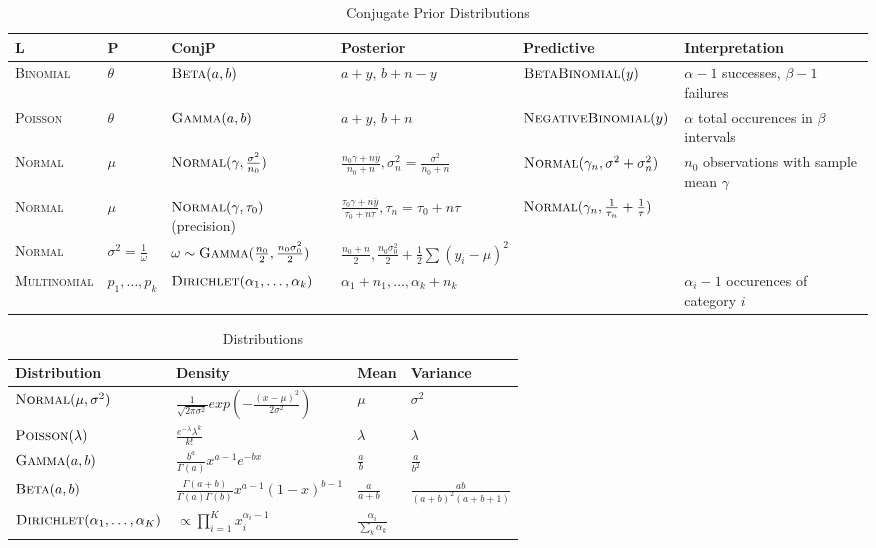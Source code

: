 \begin{table*}[p]
  \caption{Conjugate Prior Distributions}
\begin{tabular}{llllll}
\hline
L & P & ConjP & Posterior & Predictive & Interpretation \\
\hline
\textsc{Binomial} & $\theta$ & $\textsc{Beta}(a, b)$ & $a + y$, $b + n - y$ & $\textsc{BetaBinomial}(y)$ & $\alpha - 1$ successes, $\beta-1$ failures \\
\textsc{Poisson} & $\theta$ & $\textsc{Gamma}(a, b)$ & $a + y$, $b + n$ & $\textsc{NegativeBinomial}(y)$ & $\alpha$ total occurences in $\beta$ intervals \\
\textsc{Normal} & $\mu$ & $\textsc{Normal}(\gamma, \frac{\sigma^{2}}{n_{0}})$ & $\frac{n_{0} \gamma + n \overline y}{n_0 + n}, \sigma^{2}_{n} = \frac{\sigma^{2}}{n_{0} + n}$ & $\textsc{Normal}(\gamma_{n}, \sigma^{2} + \sigma^{2}_{n})$ & $n_{0}$ observations with sample mean $\gamma$ \\
\textsc{Normal} & $\mu$ & $\textsc{Normal}(\gamma, \tau_{0})$ (precision) & $\frac{\tau_{0} \gamma + n \overline y}{\tau_{0} + n \tau}, \tau_{n} = \tau_{0} + n \tau$ & $\textsc{Normal}(\gamma_{n}, \frac{1}{\tau_{n}} + \frac{1}{\tau})$ &  \\
\textsc{Normal} & $\sigma^{2} = \frac{1}{\omega}$ & $\omega \sim \textsc{Gamma}(\frac{n_{0}}{2}, \frac{n_{0} \sigma_{0}^{2}}{2})$ & $\frac{n_{0} + n}{2}, \frac{n_{0} \sigma_{0}^{2}}{2} + \frac{1}{2} \sum (y_{i} - \mu)^{2}$ &  &  \\
\textsc{Multinomial} & $p_{1}, \dots, p_{k}$ & $\textsc{Dirichlet}(\alpha_{1}, \dots, \alpha_{k})$ & $\alpha_{1} + n_{1}, \dots, \alpha_{k} + n_{k}$ &  & $\alpha_{i} - 1$ occurences of category $i$ \\
\hline
\end{tabular}
\end{table*}

\begin{table*}[p]
\caption{Distributions}
\begin{tabular}{llll}
\hline
Distribution & Density & Mean & Variance \\
\hline
$\textsc{Normal}(\mu, \sigma^{2})$ & $\frac{1}{\sqrt{2 \pi \sigma^{2}}} exp(-\frac{(x - \mu)^{2}}{2 \sigma^{2}})$ & $\mu$ & $\sigma^{2}$ \\
$\textsc{Poisson}(\lambda)$ & $\frac{e^{-\lambda} \lambda^{k}}{k!}$ & $\lambda$ & $\lambda$ \\
$\textsc{Gamma}(a, b)$ & $\frac{b^{a}}{\Gamma(a)} x^{a-1} e^{-bx}$ & $\frac{a}{b}$ & $\frac{a}{b^{2}}$ \\
$\textsc{Beta}(a, b)$ & $\frac{\Gamma(a + b)}{\Gamma(a) \Gamma(b)} x^{a-1}(1-x)^{b-1}$ & $\frac{a}{a+b}$ & $\frac{ab}{(a+b)^{2}(a + b + 1)}$ \\
$\textsc{Dirichlet}(\alpha_{1}, \dots, \alpha_{K})$ & $\propto \prod_{i=1}^{K} x_{i}^{\alpha_{i} - 1}$ & $\frac{\alpha_{i}}{\sum_{k} \alpha_{k}}$ &  \\
\hline
\end{tabular}
\end{table*}

